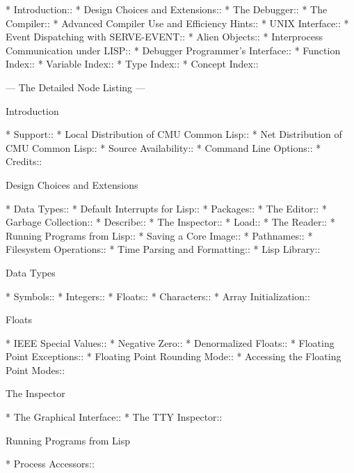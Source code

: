 


\begin{menu}
* Introduction::                
* Design Choices and Extensions::  
* The Debugger::                
* The Compiler::                
* Advanced Compiler Use and Efficiency Hints::  
* UNIX Interface::              
* Event Dispatching with SERVE-EVENT::  
* Alien Objects::               
* Interprocess Communication under LISP::  
* Debugger Programmer's Interface::  
* Function Index::              
* Variable Index::              
* Type Index::                  
* Concept Index::               

 --- The Detailed Node Listing ---

Introduction

* Support::                     
* Local Distribution of CMU Common Lisp::  
* Net Distribution of CMU Common Lisp::  
* Source Availability::         
* Command Line Options::        
* Credits::                     

Design Choices and Extensions

* Data Types::                  
* Default Interrupts for Lisp::  
* Packages::                    
* The Editor::                  
* Garbage Collection::          
* Describe::                    
* The Inspector::               
* Load::                        
* The Reader::                  
* Running Programs from Lisp::  
* Saving a Core Image::         
* Pathnames::                   
* Filesystem Operations::       
* Time Parsing and Formatting::  
* Lisp Library::                

Data Types

* Symbols::                     
* Integers::                    
* Floats::                      
* Characters::                  
* Array Initialization::        

Floats

* IEEE Special Values::         
* Negative Zero::               
* Denormalized Floats::         
* Floating Point Exceptions::   
* Floating Point Rounding Mode::  
* Accessing the Floating Point Modes::  

The Inspector

* The Graphical Interface::     
* The TTY Inspector::           

Running Programs from Lisp

* Process Accessors::           


\end{menu}
